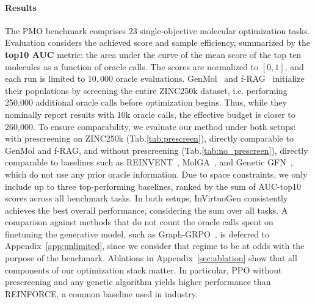 \documentclass{article} %
\begin{document}
\paragraph{Results}

The PMO benchmark comprises 23 single-objective molecular optimization tasks. Evaluation considers the achieved score and sample efficiency, summarized by the \textbf{top10 AUC} metric: the area under the curve of the mean score of the top ten molecules as a function of oracle calls. The scores are normalized to $[0,1]$, and each run is limited to $10{,}000$ oracle evaluations.
GenMol~\citep{genmol} and f-RAG~\citep{lee2024moleculegenerationfragmentretrieval} initialize their populations by screening the entire ZINC250k dataset, i.e. performing 250{,}000 additional oracle calls before optimization begins. Thus, while they nominally report results with 10k oracle calls, the effective budget is closer to 260{,}000. To ensure comparability, we evaluate our method under both setups: with prescreening on ZINC250k (Tab.\ref{tab:prescreen}), directly comparable to GenMol and f-RAG, and without prescreening (Tab.\ref{tab:no_prescreen}), directly comparable to baselines such as REINVENT~\citep{olivecrona2017molecular}, MolGA~\citep{tripp2023geneticalgorithmsstrongbaselines}, and Genetic GFN~\citep{kim2024geneticguidedgflownetssampleefficient}, which do not  use any prior oracle information. Due to space constraints, we only include up to three top-performing baselines, ranked by the sum of AUC-top10 scores across all benchmark tasks. In both setups, InVirtuoGen consistently achieves the best overall performance, considering the sum over all tasks. A comparison against methods that do not count the oracle calls spent on finetuning the generative model, such as Graph-GRPO~\citep{graphgrpo}, is deferred to Appendix~\ref{app:unlimited}, since we consider that regime to be at odds with the purpose of the benchmark. Ablations in Appendix~\ref{sec:ablation} show that all components of our optimization stack matter. In particular, PPO without prescreening and any genetic algorithm yields higher performance than REINFORCE, a common baseline used in industry.
\end{document}
